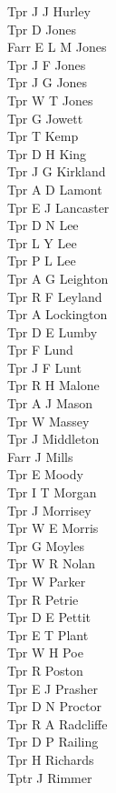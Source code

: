 \begin{multicols}{2}
  Tpr J J Hurley \\
  Tpr D Jones \\
  Farr E L M Jones \\
  Tpr J F Jones \\
  Tpr J G Jones \\
  Tpr W T Jones \\
  Tpr G Jowett \\
  Tpr T Kemp \\
  Tpr D H King \\
  Tpr J G Kirkland \\
  Tpr A D Lamont \\
  Tpr E J Lancaster \\
  Tpr D N Lee \\
  Tpr L Y Lee \\
  Tpr P L Lee \\
  Tpr A G Leighton \\
  Tpr R F Leyland \\
  Tpr A Lockington \\
  Tpr D E Lumby \\
  Tpr F Lund \\
  Tpr J F Lunt \\
  Tpr R H Malone \\
  Tpr A J Mason \\
  Tpr W Massey \\
  Tpr J Middleton \\
  Farr J Mills \\
  Tpr E Moody \\
  Tpr I T Morgan \\
  Tpr J Morrisey \\
  Tpr W E Morris \\
  Tpr G Moyles \\
  Tpr W R Nolan \\
  Tpr W Parker \\
  Tpr R Petrie \\
  Tpr D E Pettit \\
  Tpr E T Plant \\
  Tpr W H Poe \\
  Tpr R Poston \\
  Tpr E J Prasher \\
  Tpr D N Proctor \\
  Tpr R A Radcliffe \\
  Tpr D P Railing \\
  Tpr H Richards \\
  Tptr J Rimmer \\

\end{multicols}

